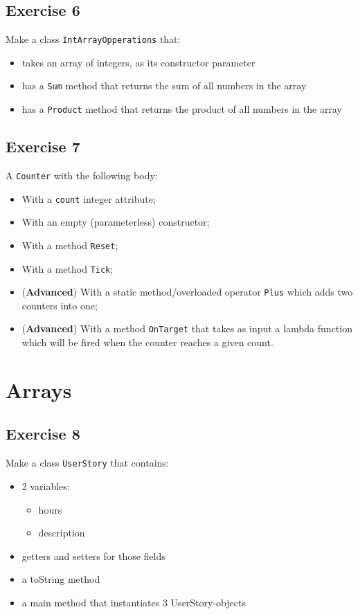 \subsection{Exercise 6} 
Make a class \texttt{IntArrayOpperations} that:
            \begin{itemize}
                \item takes an array of integers, as its constructor parameter
                \item has a \texttt{Sum} method that returns the sum of all numbers in the array
                \item has a \texttt{Product} method that returns the product of all numbers in the array
            \end{itemize}

\subsection{Exercise 7} 
A \texttt{Counter} with the following body:
            \begin{itemize}
                \item With a \texttt{count} integer attribute;
                \item With an empty (parameterless) constructor;
                \item With a method \texttt{Reset};
                \item With a method \texttt{Tick};
                \item (\textbf{Advanced}) With a static method/overloaded operator \texttt{Plus} which adds two counters into one;
                \item (\textbf{Advanced}) With a method \texttt{OnTarget} that takes as input a lambda function which will be fired when the counter reaches a given count.
            \end{itemize}
            
\section{Arrays}
\subsection{Exercise 8}
Make a class \texttt{UserStory} that contains:
                \begin{itemize}
                    \item 2 variables:
                        \begin{itemize}
                            \item hours
                            \item description
                        \end{itemize}

                        \item getters and setters for those fields
                        \item a toString method
                        \item a main method that instantiates 3 UserStory-objects
                \end{itemize}

